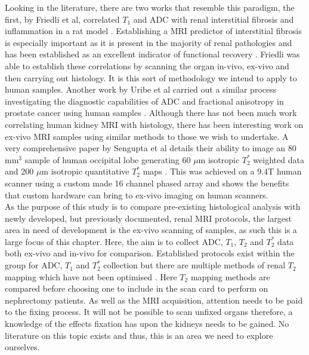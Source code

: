 Looking in the literature, there are two works that resemble this paradigm, the first, by Friedli et al, correlated $T_1$ and \ac{ADC} with renal interstitial fibrosis and inflammation in a rat model \cite{friedli_new_2016}. Establishing a \ac{MRI} predictor of interstitial fibrosis is especially important as it is present in the majority of renal pathologies and has been established as an excellent indicator of functional recovery \cite{risdon_relationship_1968}. Friedli was able to establish these correlations by scanning the organ in-vivo, ex-vivo and then carrying out histology. It is this sort of methodology we intend to apply to human samples. Another work by Uribe et al carried out a similar process investigating the diagnostic capabilities of \ac{ADC} and fractional anisotropy in prostate cancer using human samples \cite{uribe_vivo_2015}. Although there has not been much work correlating human kidney \ac{MRI} with histology, there has been interesting work on ex-vivo \ac{MRI} samples using similar methods to those we wish to undertake. A very comprehensive paper by Sengupta et al details their ability to image an 80 mm$^3$ sample of human occipital lobe generating 60 $\mu$m isotropic $T_2^*$ weighted data and 200 $\mu$m isotropic quantitative $T_2^*$ maps \cite{sengupta_high_2017}. This was achieved on a 9.4T human scanner using a custom made 16 channel phased array and shows the benefits that custom hardware can bring to ex-vivo imaging on human scanners.\\


As the purpose of this study is to compare pre-existing histological analysis with newly developed, but previously documented, renal \ac{MRI} protocols, the largest area in need of development is the ex-vivo scanning of samples, as such this is a large focus of this chapter. Here, the aim is to collect \ac{ADC}, $T_1$, $T_2$ and $T_2^*$ data both ex-vivo and in-vivo for comparison. Established protocols exist within the group for \ac{ADC}, $T_1$ and $T_2^*$ collection but there are multiple methods of renal $T_2$ mapping which have not been optimised \cite{wolf_magnetic_2018, franke_magnetic_2017, li_measuring_2015, zhang_reproducibility_2011}. Here $T_2$ mapping methods are compared before choosing one to include in the scan card to perform on nephrectomy patients. As well as the \ac{MRI} acquisition, attention needs to be paid to the fixing process. It will not be possible to scan unfixed organs therefore, a knowledge of the effects fixation has upon the kidneys needs to be gained. No literature on this topic exists and thus, this is an area we need to explore ourselves.\\

